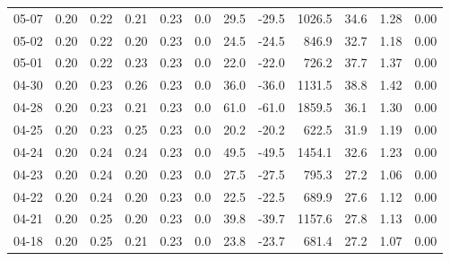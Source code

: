 \begin{threeparttable}
{\begin{tabular}{lrrrrrrrrrrr}
  05-07 &          0.20 &          0.22 &          0.21 &        0.23 &                 0.0 &                29.5 &      -29.5 &              1026.5 &             34.6 &            1.28 &                   0.00 \\
  05-02 &          0.20 &          0.22 &          0.20 &        0.23 &                 0.0 &                24.5 &      -24.5 &               846.9 &             32.7 &            1.18 &                   0.00 \\
  05-01 &          0.20 &          0.22 &          0.23 &        0.23 &                 0.0 &                22.0 &      -22.0 &               726.2 &             37.7 &            1.37 &                   0.00 \\
  04-30 &          0.20 &          0.23 &          0.26 &        0.23 &                 0.0 &                36.0 &      -36.0 &              1131.5 &             38.8 &            1.42 &                   0.00 \\
  04-28 &          0.20 &          0.23 &          0.21 &        0.23 &                 0.0 &                61.0 &      -61.0 &              1859.5 &             36.1 &            1.30 &                   0.00 \\
  04-25 &          0.20 &          0.23 &          0.25 &        0.23 &                 0.0 &                20.2 &      -20.2 &               622.5 &             31.9 &            1.19 &                   0.00 \\
  04-24 &          0.20 &          0.24 &          0.24 &        0.23 &                 0.0 &                49.5 &      -49.5 &              1454.1 &             32.6 &            1.23 &                   0.00 \\
  04-23 &          0.20 &          0.24 &          0.20 &        0.23 &                 0.0 &                27.5 &      -27.5 &               795.3 &             27.2 &            1.06 &                   0.00 \\
  04-22 &          0.20 &          0.24 &          0.20 &        0.23 &                 0.0 &                22.5 &      -22.5 &               689.9 &             27.6 &            1.12 &                   0.00 \\
  04-21 &          0.20 &          0.25 &          0.20 &        0.23 &                 0.0 &                39.8 &      -39.7 &              1157.6 &             27.8 &            1.13 &                   0.00 \\
  04-18 &          0.20 &          0.25 &          0.21 &        0.23 &                 0.0 &                23.8 &      -23.7 &               681.4 &             27.2 &            1.07 &                   0.00 \\

\end{tabular}}
\end{threeparttable}
